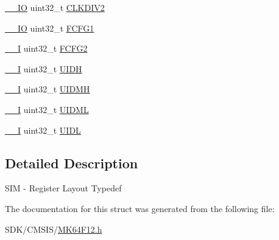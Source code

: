 \begin{DoxyCompactItemize}
\item 
\mbox{\hyperlink{core__cm4_8h_aec43007d9998a0a0e01faede4133d6be}{\+\_\+\+\_\+\+IO}} uint32\+\_\+t \mbox{\hyperlink{group___v_r_e_f___peripheral___access___layer_gaa5a0af4eb767983cb4031ba24d2bc9d6}{C\+L\+K\+D\+I\+V2}}
\item 
\mbox{\hyperlink{core__cm4_8h_aec43007d9998a0a0e01faede4133d6be}{\+\_\+\+\_\+\+IO}} uint32\+\_\+t \mbox{\hyperlink{group___v_r_e_f___peripheral___access___layer_ga1b5282422d8bb162cd742775e5f9864f}{F\+C\+F\+G1}}
\item 
\mbox{\hyperlink{core__cm4_8h_af63697ed9952cc71e1225efe205f6cd3}{\+\_\+\+\_\+I}} uint32\+\_\+t \mbox{\hyperlink{group___v_r_e_f___peripheral___access___layer_ga48581edecb6a9421e0e159dca5bf8c8c}{F\+C\+F\+G2}}
\item 
\mbox{\hyperlink{core__cm4_8h_af63697ed9952cc71e1225efe205f6cd3}{\+\_\+\+\_\+I}} uint32\+\_\+t \mbox{\hyperlink{group___v_r_e_f___peripheral___access___layer_gae6ab5d5097134742b3f025d951a482aa}{U\+I\+DH}}
\item 
\mbox{\hyperlink{core__cm4_8h_af63697ed9952cc71e1225efe205f6cd3}{\+\_\+\+\_\+I}} uint32\+\_\+t \mbox{\hyperlink{group___v_r_e_f___peripheral___access___layer_ga6526be9b8cd1160be6ff367641220e96}{U\+I\+D\+MH}}
\item 
\mbox{\hyperlink{core__cm4_8h_af63697ed9952cc71e1225efe205f6cd3}{\+\_\+\+\_\+I}} uint32\+\_\+t \mbox{\hyperlink{group___v_r_e_f___peripheral___access___layer_ga9d04f09d406768348505eb747ade1e23}{U\+I\+D\+ML}}
\item 
\mbox{\hyperlink{core__cm4_8h_af63697ed9952cc71e1225efe205f6cd3}{\+\_\+\+\_\+I}} uint32\+\_\+t \mbox{\hyperlink{group___v_r_e_f___peripheral___access___layer_gaac796478e9fdd908d4bccc7b754de080}{U\+I\+DL}}
\end{DoxyCompactItemize}


\subsection{Detailed Description}
S\+IM -\/ Register Layout Typedef 

The documentation for this struct was generated from the following file\+:\begin{DoxyCompactItemize}
\item 
S\+D\+K/\+C\+M\+S\+I\+S/\mbox{\hyperlink{_m_k64_f12_8h}{M\+K64\+F12.\+h}}\end{DoxyCompactItemize}
